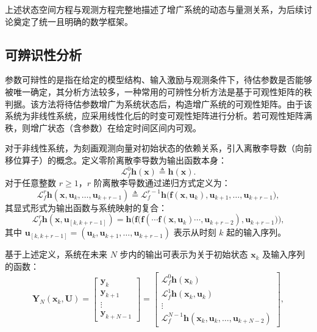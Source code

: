 上述状态空间方程与观测方程完整地描述了增广系统的动态与量测关系，为后续讨论奠定了统一且明确的数学框架。

\subsection{可辨识性分析} %
参数可辩性的是指在给定的模型结构、输入激励与观测条件下，待估参数是否能够被唯一确定，其分析方法较多，一种常用的可辨性分析方法是基于可观性矩阵的秩判据。该方法将待估参数增广为系统状态后，构造增广系统的可观性矩阵。由于该系统为非线性系统，应采用线性化后的时变可观性矩阵进行分析。若可观性矩阵满秩，则增广状态（含参数）在给定时间区间内可观。

对于非线性系统，为刻画观测向量对初始状态的依赖关系，引入离散李导数（向前移位算子）的概念。定义零阶离散李导数为输出函数本身：
\begin{equation}
    \mathcal{L}_f^0 \bm{h}(\bm{x}) \triangleq \bm{h}(\bm{x}).
\end{equation}
对于任意整数 $r \ge 1$，$r$ 阶离散李导数通过递归方式定义为：
\begin{equation}
    \mathcal{L}_f^r \bm{h}(\bm{x}, \bm{u}_k, \dots, \bm{u}_{k+r-1}) 
\triangleq \mathcal{L}_f^{r-1} \bm{h}\big( \bm{f}(\bm{x}, \bm{u}_k), \bm{u}_{k+1}, \dots, \bm{u}_{k+r-1} \big),
\end{equation}
其显式形式为输出函数与系统映射的复合：
\begin{equation}
    \mathcal{L}_f^r \bm{h}(\bm{x}, \bm{u}_{[k,k+r-1]}) = \bm{h}\Big( \bm{f}\big( \bm{f}( \cdots \bm{f}(\bm{x}, \bm{u}_k) \cdots, \bm{u}_{k+r-2}), \bm{u}_{k+r-1} \big) \Big),
\end{equation}
其中 $\bm{u}_{[k,k+r-1]} = (\bm{u}_k, \bm{u}_{k+1}, \dots, \bm{u}_{k+r-1})$ 表示从时刻 $k$ 起的输入序列。

基于上述定义，系统在未来 $N$ 步内的输出可表示为关于初始状态 $\bm{x}_k$ 及输入序列的函数：
\begin{equation}\label{eq:output_sequence}
    \bm{Y}_N(\bm{x}_k, \bm{U}) = 
    \begin{bmatrix}
        \bm{y}_k \\ \bm{y}_{k+1} \\ \vdots \\ \bm{y}_{k+N-1}
    \end{bmatrix}
    =
    \begin{bmatrix}
        \mathcal{L}_f^0 \bm{h}(\bm{x}_k) \\
        \mathcal{L}_f^1 \bm{h}(\bm{x}_k, \bm{u}_k) \\
        \vdots \\
        \mathcal{L}_f^{N-1} \bm{h}(\bm{x}_k, \bm{u}_k, \dots, \bm{u}_{k+N-2})
    \end{bmatrix},
\end{equation}

